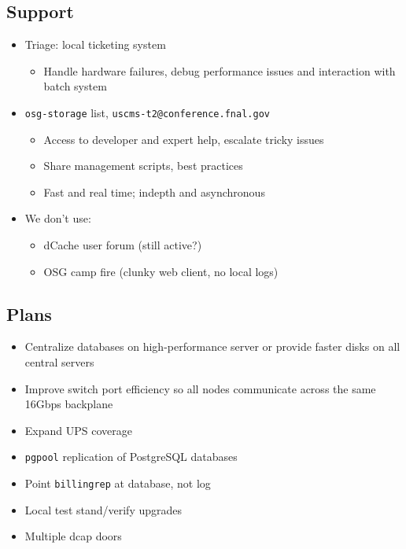 \documentclass{beamer}
\begin{document}
\subsection{Support}
\begin{frame}
\begin{itemize}
	\item Triage: local ticketing system
	\begin{itemize}
		\item Handle hardware failures, debug performance issues and interaction with batch system
	\end{itemize}
	\item {\tt osg-storage} list, {\tt uscms-t2@conference.fnal.gov}
	\begin{itemize}
		\item Access to developer and expert help, escalate tricky issues
		\item Share management scripts, best practices
		\item Fast and real time; indepth and asynchronous
	\end{itemize}
	\item We don't use:
	\begin{itemize}
		\item dCache user forum (still active?)
		\item OSG camp fire (clunky web client, no local logs)
	\end{itemize}
\end{itemize}
\end{frame}

\subsection{Plans}
\begin{frame}
\begin{itemize}
	\item Centralize databases on high-performance server or provide faster disks on all central servers
	\item Improve switch port efficiency so all nodes communicate across the same 16Gbps backplane
	\item Expand UPS coverage
	\item {\tt pgpool} replication of PostgreSQL databases
	\item Point {\tt billingrep} at database, not log
	\item Local test stand/verify upgrades
	\item Multiple dcap doors
\end{itemize}
\end{frame}
\end{document}

